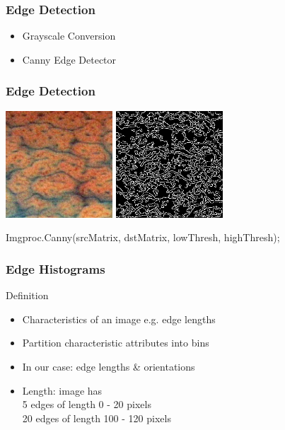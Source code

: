 \documentclass{beamer}
\begin{document}
\begin{frame}
	\frametitle{Edge Detection}
	\begin{block}{}
		\begin{itemize}
			\item Grayscale Conversion
			\item Canny Edge Detector
		\end{itemize}
	\end{block}
\end{frame}

\begin{frame}[fragile]
	\frametitle{Edge Detection}
	\includegraphics[width = 4cm]{after_1.jpg}
	\includegraphics[width = 4cm]{edges_detected.png}		
	\begin{verbatimtab}
Imgproc.Canny(srcMatrix, dstMatrix, 
 lowThresh, highThresh);
	\end{verbatimtab}
\end{frame}

\begin{frame}
	\frametitle{Edge Histograms}
	\begin{block}{Definition}
		\begin{itemize}
			\item Characteristics of an image e.g. edge lengths
			\item Partition characteristic attributes into bins
			\item In our case: edge lengths \& orientations
			\item Length: image has\\
			5 edges of length 0 - 20 pixels\\
			20 edges of length 100 - 120 pixels
		\end{itemize}
	\end{block}
	
\end{frame}
\end{document}
